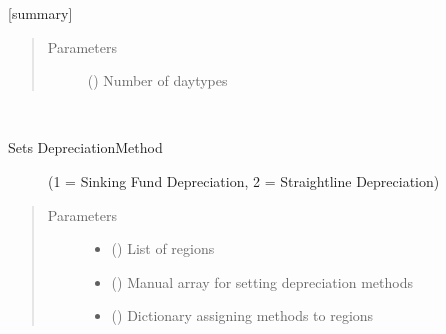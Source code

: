 \documentclass[a4paper,12pt,english]{article}
\begin{document}
\begin{fulllineitems}
\begin{fulllineitems}
\label{\detokenize{GOCPI:GOCPI.CreateCases.CreateCases.set_daytype}}
{[}summary{]}
\begin{quote}\begin{description}
\item[{Parameters}] \leavevmode
{} () \textendash{} Number of daytypes

\end{description}\end{quote}

\end{fulllineitems}


\begin{fulllineitems}
\label{\detokenize{GOCPI:GOCPI.CreateCases.CreateCases.set_depreciation_method}}~\begin{description}
\item[{Sets DepreciationMethod}] \leavevmode
(1 = Sinking Fund Depreciation, 2 = Straightline Depreciation)

\end{description}
\begin{quote}\begin{description}
\item[{Parameters}] \leavevmode\begin{itemize}
\item {} 
 () \textendash{} List of regions

\item {} 
 (\sphinxstyleliteralemphasis{\sphinxupquote{, }}) \textendash{} Manual array for setting depreciation methods

\item {} 
 () \textendash{} Dictionary assigning methods to regions


\end{itemize}
\end{description}
\end{quote}
\end{fulllineitems}
\end{fulllineitems}
\end{document}
